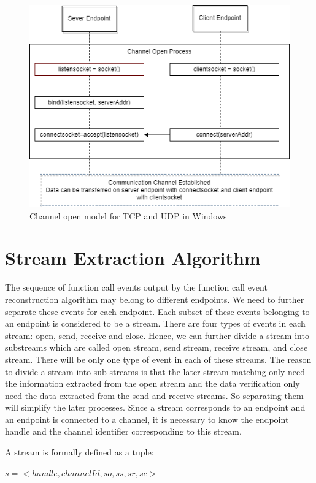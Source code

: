 \begin{figure}[H]
\centerline{\includegraphics[scale=0.6]{Figures/tcpudpchannelopen}}
 \caption{Channel open model for TCP and UDP in Windows}
\label{channelopen2}    
\end{figure}

\section{Stream Extraction Algorithm}
The sequence of function call events output by the function call event reconstruction algorithm may belong to different endpoints. We need to further separate these events for each endpoint. Each subset of these events belonging to an endpoint is considered to be a stream. There are four types of events in each stream: open, send, receive and close. Hence, we can further divide a stream into substreams which are called open stream, send stream, receive stream, and close stream. There will be only one type of event in each of these streams. The reason to divide a stream into sub streams is that the later stream matching only need the information extracted from the open stream and the data verification only need the data extracted from the send and receive streams. So separating them will simplify the later processes. Since a stream corresponds to an endpoint and an endpoint is connected to a channel, it is necessary to know the endpoint handle and the channel identifier corresponding to this stream. 

A stream is formally defined as a tuple:

$s = <handle, channelId, so, ss, sr, sc>$

